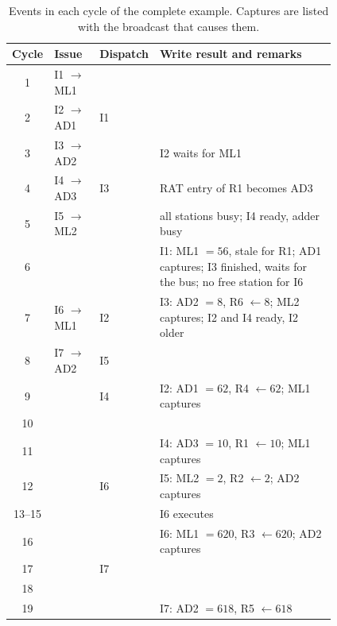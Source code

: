 \documentclass[../main.tex]{subfiles}
\begin{document}
\begin{table}[htbp]
  \centering\small
  \caption{Events in each cycle of the complete example.  Captures are listed
    with the broadcast that causes them.}
  \label{tab:l07-trace}
  \begin{tabular}{@{}c>{\raggedright\arraybackslash}p{0.14\linewidth}>{\raggedright\arraybackslash}p{0.12\linewidth}>{\raggedright\arraybackslash}p{0.55\linewidth}@{}}
    \toprule
    Cycle & Issue & Dispatch & Write result and remarks \\
    \midrule
    1     & I1 $\to$ ML1 &    & \\
    2     & I2 $\to$ AD1 & I1 & \\
    3     & I3 $\to$ AD2 &    & I2 waits for ML1 \\
    4     & I4 $\to$ AD3 & I3 & RAT entry of R1 becomes AD3 \\
    5     & I5 $\to$ ML2 &    & all stations busy; I4 ready, adder busy \\
    6     &              &    & I1: ML1 $=56$, stale for R1; AD1 captures;
                                I3 finished, waits for the bus;
                                no free station for I6 \\
    7     & I6 $\to$ ML1 & I2 & I3: AD2 $=8$, R6 $\leftarrow 8$; ML2 captures;
                                I2 and I4 ready, I2 older \\
    8     & I7 $\to$ AD2 & I5 & \\
    9     &              & I4 & I2: AD1 $=62$, R4 $\leftarrow 62$; ML1 captures \\
    10    &              &    & \\
    11    &              &    & I4: AD3 $=10$, R1 $\leftarrow 10$; ML1 captures \\
    12    &              & I6 & I5: ML2 $=2$, R2 $\leftarrow 2$; AD2 captures \\
    13--15 &             &    & I6 executes \\
    16    &              &    & I6: ML1 $=620$, R3 $\leftarrow 620$; AD2 captures \\
    17    &              & I7 & \\
    18    &              &    & \\
    19    &              &    & I7: AD2 $=618$, R5 $\leftarrow 618$ \\
    \bottomrule
  \end{tabular}
\end{table}
\end{document}
